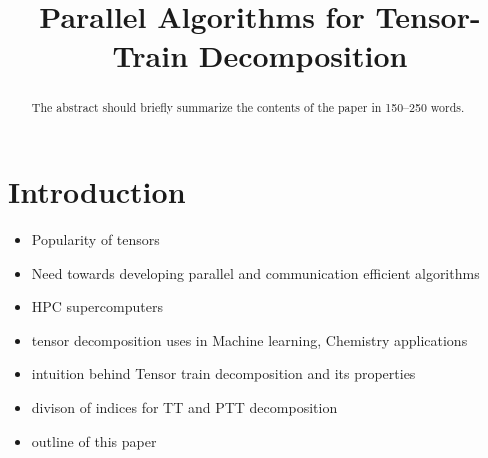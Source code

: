 \documentclass[runningheads]{llncs}
\begin{document}
%
\title{Parallel Algorithms for Tensor-Train Decomposition}
\author{}
\institute{}
\maketitle       %

\begin{abstract}
The abstract should briefly summarize the contents of the paper in
150--250 words.

\end{abstract}

\section{Introduction}
\label{sec:introduction}
\begin{itemize}
	\item Popularity of tensors
	\item Need towards developing parallel and communication efficient algorithms
	\item HPC supercomputers
	\item tensor decomposition uses in Machine learning, Chemistry applications
	\item intuition behind Tensor train decomposition and its properties
	\item divison of indices for TT and PTT decomposition
	\item outline of this paper
\end{itemize}
\end{document}
